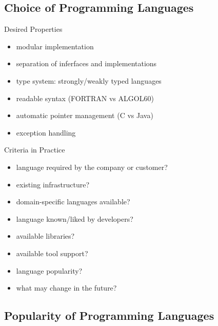 \subsection{Choice of Programming Languages}
\begin{frame}{\insertsubsection}
	\begin{fancycolumns}
		\begin{definition}{{Desired Properties\mysource{\ludewiglichter}}}
			\begin{itemize}
				\item modular implementation
				\item separation of inferfaces and implementations
				\item type system: strongly/weakly typed languages
				\item readable syntax (FORTRAN vs ALGOL60) %
				\item automatic pointer management (C vs Java)
				\item exception handling
			\end{itemize}
		\end{definition}
	\nextcolumn
		\begin{example}{Criteria in Practice}
			\begin{itemize}
				\item language required by the company or customer?
				\item existing infrastructure?
				\item domain-specific languages available?
				\item language known/liked by developers?
				\item available libraries?
				\item available tool support?
				\item language popularity?
				\item what may change in the future?
			\end{itemize}
		\end{example}
	\end{fancycolumns}
\end{frame}

\subsection{Popularity of Programming Languages}
\begin{frame}{\insertsubsection}
	\slideTiobeDiagram
\end{frame}
\begin{frame}{\insertsubsection}
	\slideTiobeTable
\end{frame}

